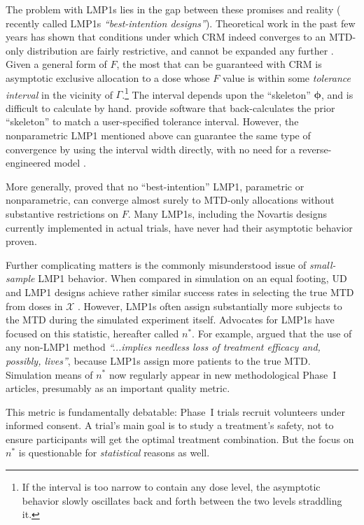 The problem with LMP1s lies in the gap between these promises and reality (\cite{Fedo:Flou:Wu:Zhang:Best:2011} recently called LMP1s \emph{``best-intention designs''}). Theoretical work in the past few years has shown that conditions under which CRM indeed converges to an MTD-only distribution are fairly restrictive, and cannot be expanded any further \citep{Azri:anot:2012,Lee:Cheu:interv:calibr:2009,oron:azri:hoff:dose:2011}. Given a general form of $F$, the most that can be guaranteed with CRM is asymptotic exclusive allocation to a dose whose $F$ value is within some \emph{tolerance interval} in the vicinity of $\Gamma$.\footnote{If the interval is too narrow to contain any dose level, the asymptotic behavior slowly oscillates back and forth between the two levels straddling it.} The interval depends upon the ``skeleton'' $\boldsymbol{\phi}$, and is difficult to calculate by hand. \cite{Lee:Cheu:interv:calibr:2009} provide software that back-calculates the prior ``skeleton'' to match a user-specified tolerance interval. However, the nonparametric LMP1 mentioned above can guarantee the same type of convergence by using the interval width directly, with no need for a reverse-engineered model \citep{Ivan:Flou:Chun:Cumu:2007,oron:azri:hoff:dose:2011}.

More generally, \cite{Azri:etal:imposs:2011} proved that no ``best-intention'' LMP1, parametric or nonparametric, can converge almost surely to MTD-only allocations without substantive restrictions on $F$. Many LMP1s, including the Novartis designs currently implemented in actual trials, have never had their asymptotic behavior proven.

Further complicating matters is the commonly misunderstood issue of \emph{small-sample} LMP1 behavior. When compared in simulation on an equal footing, UD and LMP1 designs achieve rather similar success rates in selecting the true MTD from doses in $\mathcal{X}$ \citep{Oron:Hoff:smal:2013}. However, LMP1s often assign substantially more subjects to the MTD during the simulated experiment itself. Advocates for LMP1s have focused on this statistic, hereafter called $n^*$. For example, \cite{Rogat:etal:oped:2007} argued that the use of any non-LMP1 method \emph{``...implies needless loss of treatment efficacy and, possibly, lives''}, because LMP1s assign more patients to the true MTD. Simulation means of $n^*$ now regularly appear in new methodological Phase~I articles, presumably as an important quality metric.

This metric is fundamentally debatable: Phase~I trials recruit volunteers under informed consent. A trial's main goal is to study a treatment's safety, not to ensure participants will get the optimal treatment combination. But the focus on $n^*$ is questionable for \emph{statistical} reasons as well.

